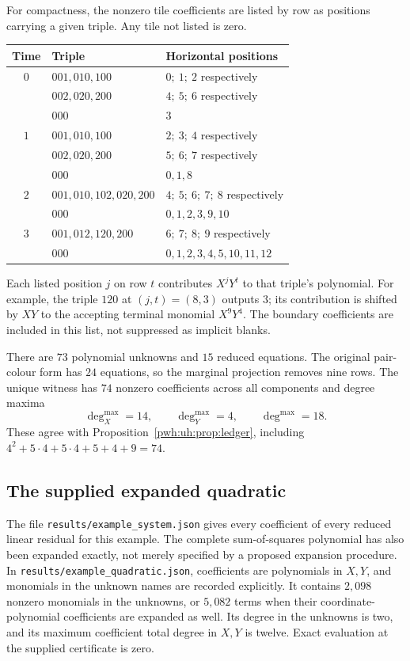 \documentclass[11pt,letterpaper]{article}
\numberwithin{equation}{section}
\theoremstyle{definition}
\newcommand{\codename}[1]{\texttt{\small #1}}
\begin{document}
For compactness, the nonzero tile coefficients are listed by row as
positions carrying a given triple. Any tile not listed is zero.
\begin{center}
\small
\begin{tabular}{@{}cll@{}}
\toprule
Time & Triple & Horizontal positions\\
\midrule
$0$ & $001,010,100$ & $0;\ 1;\ 2$ respectively\\
    & $002,020,200$ & $4;\ 5;\ 6$ respectively\\
    & $000$ & $3$\\[2pt]
$1$ & $001,010,100$ & $2;\ 3;\ 4$ respectively\\
    & $002,020,200$ & $5;\ 6;\ 7$ respectively\\
    & $000$ & $0,1,8$\\[2pt]
$2$ & $001,010,102,020,200$ & $4;\ 5;\ 6;\ 7;\ 8$ respectively\\
    & $000$ & $0,1,2,3,9,10$\\[2pt]
$3$ & $001,012,120,200$ & $6;\ 7;\ 8;\ 9$ respectively\\
    & $000$ & $0,1,2,3,4,5,10,11,12$\\
\bottomrule
\end{tabular}
\end{center}
Each listed position $j$ on row $t$ contributes $X^jY^t$ to that triple's
polynomial. For example, the triple $120$ at $(j,t)=(8,3)$ outputs $3$;
its contribution is shifted by $XY$ to the accepting terminal monomial
$X^9Y^4$. The boundary coefficients are included in this list, not
suppressed as implicit blanks.

There are $73$ polynomial unknowns and $15$ reduced equations. The original
pair-colour form has $24$ equations, so the marginal projection removes
nine rows. The unique witness has $74$ nonzero coefficients across all
components and degree maxima
\[
 \deg_X^{\max}=14,\qquad \deg_Y^{\max}=4,\qquad \deg^{\max}=18.
\]
These agree with Proposition~\ref{pwh:uh:prop:ledger}, including
$4^2+5\cdot4+5\cdot4+5+4+9=74$.

\subsection{The supplied expanded quadratic}

The file \codename{results/example\_system.json} gives every coefficient
of every reduced linear residual for this example. The complete
sum-of-squares polynomial has also been expanded exactly, not merely
specified by a proposed expansion procedure. In
\codename{results/example\_quadratic.json}, coefficients are polynomials
in $X,Y$, and monomials in the unknown names are recorded explicitly.
It contains $2{,}098$ nonzero monomials in the unknowns, or $5{,}082$
terms when their coordinate-polynomial coefficients are expanded as well.
Its degree in the unknowns is two, and its maximum coefficient total
degree in $X,Y$ is twelve. Exact evaluation at the supplied certificate
is zero.
\end{document}
